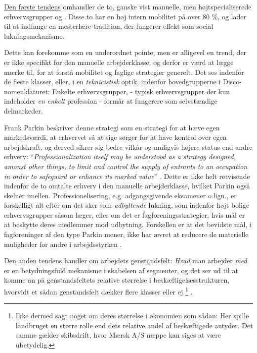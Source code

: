 \underline{Den første tendens} omhandler de to, ganske vist manuelle, men højtspecialiserede erhvervsgrupper  og . Disse to har en høj intern mobilitet på over 80 \%, og lader til at indfange en mesterlære-tradition, der fungerer effekt som social lukningsmekanisme. 

Dette kan forekomme som en underordnet pointe, men er alligevel en trend, der er ikke specifikt for den manuelle arbejderklasse, og derfor er værd at lægge mærke til, for at forstå mobilitet og faglige strategier generelt. Det ses indenfor de fleste klasser, eller, i en  \emph{teknicistisk} optik, indenfor hovedgrupperne i Disco-nomenklaturet: Enkelte erhvervsgrupper, - typisk erhvervsgrupper der kun indeholder \emph{en enkelt} profession - formår at fungerere som selvstændige delmarkeder. 

Frank Parkin beskriver denne strategi som en strategi for at hæve egen markedsværdi, at erhvervet så at sige sørger for at have kontrol over egen arbejdskraft, og derved sikrer sig bedre vilkår og muligvis højere status end andre erhverv: “\emph{Professionalization itself may be understood as a strategy designed, amonst other things, to limit and control the supply of entrants to an occupation in order to safeguard or enhance its marked value}” \parencite[54]{Parkin1979}. Dette er ikke helt retvisende indenfor de to omtalte erhverv i den manuelle arbejderklasse, hvilket Parkin også skelner imellen. Professionelisering, e.g. adgangsgivende eksamener o.lign., er forskelligt alt efter om det sker som \emph{udbyttende} lukning, som indenfor højt bolige erhvervsgrupper såsom læger, eller om det er fagforeningsstrategier, hvis mål er at beskytte deres medlemmer mod udbytning. Forskellen er at det bevidste mål, i fagforeninger af den type Parkin mener, ikke har ævret at reducere de materielle muligheder for andre i arbejdsstyrken \parencite[57]{Parkin1979}. 

\underline{Den anden tendens} handler om arbejdets genstandsfelt: \emph{Hvad} man arbejder \emph{med} er en betydningsfuld mekanisme i skabelsen af segmenter, og det ser ud til at komme an på genstandsfeltets relative størrelse i beskæftigelsesstrukturen, hvorvidt et sådan genstandsfelt dækker flere klasser eller ej%
%
    \footnote{ Ikke dermed sagt noget om deres størrelse i økonomien som sådan: Her spille landbruget en større rolle end dets relative andel af beskæftigede antyder. Det samme gælder skibsdrift, hvor Mærsk A/S næppe kan siges at være ubetydelig.}%
%
.  

